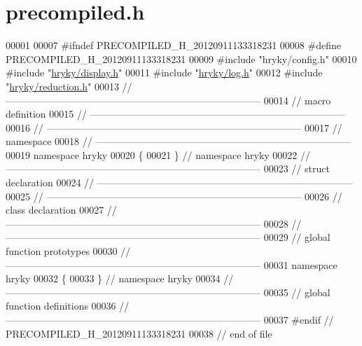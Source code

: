 \hypertarget{display_2src_2precompiled_8h_source}{\section{precompiled.\-h}
}

\begin{DoxyCode}
00001 
00007 \textcolor{preprocessor}{#ifndef PRECOMPILED\_H\_20120911133318231}
00008 \textcolor{preprocessor}{}\textcolor{preprocessor}{#define PRECOMPILED\_H\_20120911133318231}
00009 \textcolor{preprocessor}{}\textcolor{preprocessor}{#include "hryky/config.h"}
00010 \textcolor{preprocessor}{#include "\hyperlink{display_8h}{hryky/display.h}"}
00011 \textcolor{preprocessor}{#include "\hyperlink{log_8h}{hryky/log.h}"}
00012 \textcolor{preprocessor}{#include "\hyperlink{reduction_8h}{hryky/reduction.h}"}
00013 \textcolor{comment}{//
      ------------------------------------------------------------------------------}
00014 \textcolor{comment}{// macro definition}
00015 \textcolor{comment}{//
      ------------------------------------------------------------------------------}
00016 \textcolor{comment}{//
      ------------------------------------------------------------------------------}
00017 \textcolor{comment}{// namespace}
00018 \textcolor{comment}{//
      ------------------------------------------------------------------------------}
00019 \textcolor{keyword}{namespace }hryky
00020 \{
00021 \} \textcolor{comment}{// namespace hryky}
00022 \textcolor{comment}{//
      ------------------------------------------------------------------------------}
00023 \textcolor{comment}{// struct declaration}
00024 \textcolor{comment}{//
      ------------------------------------------------------------------------------}
00025 \textcolor{comment}{//
      ------------------------------------------------------------------------------}
00026 \textcolor{comment}{// class declaration}
00027 \textcolor{comment}{//
      ------------------------------------------------------------------------------}
00028 \textcolor{comment}{//
      ------------------------------------------------------------------------------}
00029 \textcolor{comment}{// global function prototypes}
00030 \textcolor{comment}{//
      ------------------------------------------------------------------------------}
00031 \textcolor{keyword}{namespace }hryky
00032 \{
00033 \} \textcolor{comment}{// namespace hryky}
00034 \textcolor{comment}{//
      ------------------------------------------------------------------------------}
00035 \textcolor{comment}{// global function definitions}
00036 \textcolor{comment}{//
      ------------------------------------------------------------------------------}
00037 \textcolor{preprocessor}{#endif // PRECOMPILED\_H\_20120911133318231}
00038 \textcolor{preprocessor}{}\textcolor{comment}{// end of file}
\end{DoxyCode}
